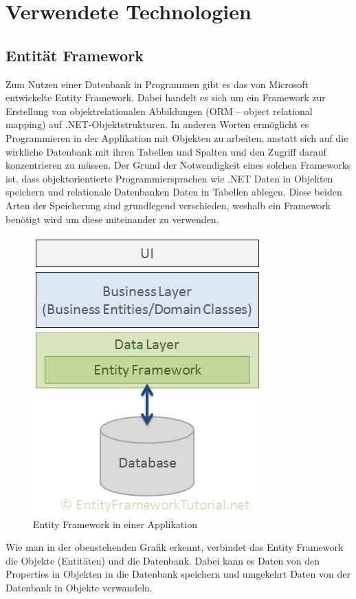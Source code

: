 \chapter{Verwendete Technologien}\label{cha:theoretical-background}
\section{Entität Framework}
Zum Nutzen einer Datenbank in Programmen gibt es das von Microsoft entwickelte Entity Framework. Dabei handelt es sich um ein Framework zur Erstellung von objektrelationalen Abbildungen (ORM – object relational mapping) auf .NET-Objektstrukturen. In anderen Worten ermöglicht es Programmieren in der Applikation mit Objekten zu arbeiten, anstatt sich auf die wirkliche Datenbank mit ihren Tabellen und Spalten und den Zugriff darauf konzentrieren zu müssen. Der Grund der Notwendigkeit eines solchen Frameworks ist, dass objektorientierte Programmiersprachen wie .NET Daten in Objekten speichern und relationale Datenbanken Daten in Tabellen ablegen. Diese beiden Arten der Speicherung sind grundlegend verschieden, weshalb ein Framework benötigt wird um diese miteinander zu verwenden.
\begin{figure}[H]
\begin{center}
	\includegraphics[scale=.7]{images/ef.png}
\end{center}
	\caption{Entity Framework in einer Applikation}
	\label{fig:sample}
\end{figure}
Wie man in der obenstehenden Grafik erkennt, verbindet das Entity Framework die Objekte (Entitäten) und die Datenbank. Dabei kann es Daten von den Properties in  Objekten in die Datenbank speichern und umgekehrt Daten von der Datenbank in Objekte verwandeln.
